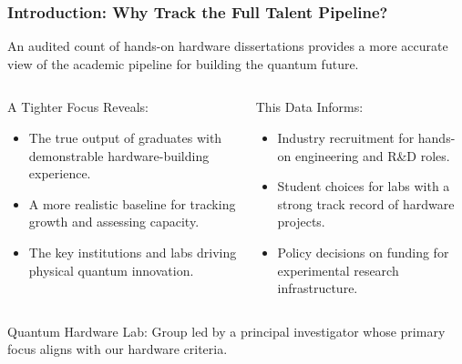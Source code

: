 \documentclass[aspectratio=169]{beamer}
\begin{document}
\begin{frame}
    \frametitle{Introduction:  Why Track the Full Talent Pipeline?}
    An audited count of hands-on hardware dissertations provides a more accurate view of the academic pipeline for building the quantum future.
    
    \begin{columns}[T]
        \begin{column}{0.5\textwidth}
            \begin{block}{A Tighter Focus Reveals:}
                \begin{itemize}
                    \item The true output of graduates with demonstrable hardware-building experience.
                    \item A more realistic baseline for tracking growth and assessing capacity.
                    \item The key institutions and labs driving physical quantum innovation.
                \end{itemize}
            \end{block}
        \end{column}
        \begin{column}{0.5\textwidth}
            \begin{block}{This Data Informs:}
                \begin{itemize}
                    \item Industry recruitment for hands-on engineering and R\&D roles.
                    \item Student choices for labs with a strong track record of hardware projects.
                    \item Policy decisions on funding for experimental research infrastructure.
                \end{itemize}
            \end{block}
        \end{column}
    \end{columns}
    \vspace{1em}        
        Quantum Hardware Lab: Group led by a principal investigator whose primary focus aligns with our hardware criteria.
\end{frame}
\end{document}
